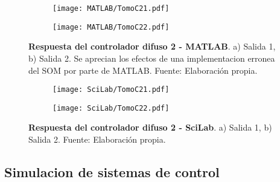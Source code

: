        \begin{figure}[htb]
            \centering
            \begin{subfigure}[t]{0.49\textwidth}
                \centering
                \texttt{[image: MATLAB/TomoC21.pdf]}
                \caption{}
                \label{fig:respuestaC21MATLAB}
            \end{subfigure}
            \hfill
            \begin{subfigure}[t]{0.49\textwidth}
                \centering
                \texttt{[image: MATLAB/TomoC22.pdf]}
                \caption{}
                \label{fig:respuestaC22MATLAB}
            \end{subfigure}
            
            \caption[Comparacion - Respuesta del controlador difuso 2 - MATLAB]{\textbf{Respuesta del controlador difuso 2 - MATLAB}. a) Salida 1, b) Salida 2. Se aprecian los efectos de una implementacion erronea del SOM por parte de MATLAB. Fuente: Elaboración propia. \label{fig:respuestaC2MATLAB}}
        \end{figure}

        \begin{figure}[htb]
            \centering
            \begin{subfigure}[t]{0.49\textwidth}
                \centering
                \texttt{[image: SciLab/TomoC21.pdf]}
                \caption{}
                \label{fig:respuestaC21SciLab}
            \end{subfigure}
            \hfill
            \begin{subfigure}[t]{0.49\textwidth}
                \centering
                \texttt{[image: SciLab/TomoC22.pdf]}
                \caption{}
                \label{fig:respuestaC22SciLab}
            \end{subfigure}
            
            \caption[Comparacion - Respuesta del controlador difuso 2 - SciLab]{\textbf{Respuesta del controlador difuso 2 - SciLab}. a) Salida 1, b) Salida 2. Fuente: Elaboración propia. \label{fig:respuestaC2SciLab}}
        \end{figure}

        \clearpage

    \subsection{Simulacion de sistemas de control}
        
